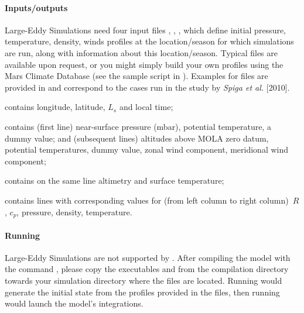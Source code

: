 \paragraph{Inputs/outputs} Large-Eddy Simulations need four input files , , ,  which define initial pressure, temperature, density, winds profiles at the location/season for which simulations are run, along with information about this location/season. Typical files are available upon request, or you might simply build your own profiles using the Mars Climate Database (see the sample  script  in ). Examples for  files are provided in  and correspond to the cases run in the study by \textit{Spiga et al.} [2010].


\begin{citemize}
\item {} contains longitude, latitude, $L_s$ and local time;
\item {} contains (first line) near-surface pressure (mbar), potential temperature, a dummy value; and (subsequent lines) altitudes above MOLA zero datum, potential temperatures, dummy value, zonal wind component, meridional wind component;
\item {} contains on the same line altimetry and surface temperature;
\item {} contains lines with corresponding values for (from left column to right column)~$R$, $c_p$, pressure, density, temperature.
\end{citemize}

\paragraph{Running} Large-Eddy Simulations are not supported by . After compiling the model with the command , please copy the executables  and  from the compilation directory  towards your simulation directory where the  files are located. Running  would generate the initial state  from the profiles provided in the  files, then running  would launch the model's integrations.


